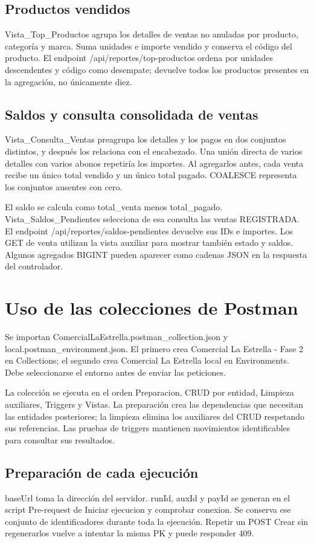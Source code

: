 \subsection{Productos vendidos}
Vista\_Top\_Productos agrupa los detalles de ventas no anuladas por producto, categoría y marca. Suma unidades e importe vendido y conserva el código del producto. El endpoint /api/reportes/top-productos ordena por unidades descendentes y código como desempate; devuelve todos los productos presentes en la agregación, no únicamente diez.

\subsection{Saldos y consulta consolidada de ventas}
Vista\_Consulta\_Ventas preagrupa los detalles y los pagos en dos conjuntos distintos, y después los relaciona con el encabezado. Una unión directa de varios detalles con varios abonos repetiría los importes. Al agregarlos antes, cada venta recibe un único total vendido y un único total pagado. COALESCE representa los conjuntos ausentes con cero.

El saldo se calcula como total\_venta menos total\_pagado. Vista\_Saldos\_Pendientes selecciona de esa consulta las ventas REGISTRADA. El endpoint /api/reportes/saldos-pendientes devuelve sus IDs e importes. Los GET de venta utilizan la vista auxiliar para mostrar también estado y saldos. Algunos agregados BIGINT pueden aparecer como cadenas JSON en la respuesta del controlador.


\section{Uso de las colecciones de Postman}
Se importan ComercialLaEstrella.postman\_collection.json y local.postman\_environment.json. El primero crea Comercial La Estrella - Fase 2 en Collections; el segundo crea Comercial La Estrella local en Environments. Debe seleccionarse el entorno antes de enviar las peticiones.

La colección se ejecuta en el orden Preparacion, CRUD por entidad, Limpieza auxiliares, Triggers y Vistas. La preparación crea las dependencias que necesitan las entidades posteriores; la limpieza elimina los auxiliares del CRUD respetando sus referencias. Las pruebas de triggers mantienen movimientos identificables para consultar sus resultados.

\subsection{Preparación de cada ejecución}
baseUrl toma la dirección del servidor. runId, auxId y payId se generan en el script Pre-request de Iniciar ejecucion y comprobar conexion. Se conserva ese conjunto de identificadores durante toda la ejecución. Repetir un POST Crear sin regenerarlos vuelve a intentar la misma PK y puede responder 409.

